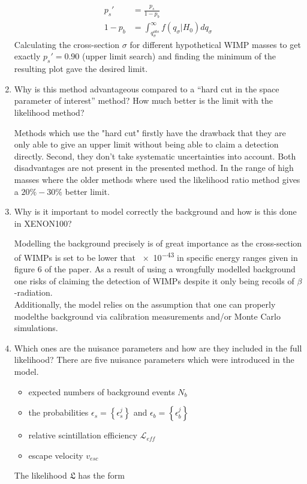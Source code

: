 \documentclass[10pt]{article}
\newenvironment{myfont}{\fontfamily{put}\selectfont}{\par}
\newcommand{\likelihood}{\mathfrak{L}}
\begin{document}
\begin{myfont}
\begin{enumerate}[label = \textbf{\roman*}.]
  \begin{align}
      p_s' &= \frac{p_s}{1-p_b} \\
      1 - p_b  &= \int^\infty_{q^{obs}_{\sigma}} f(q_{\sigma}|H_{0})  dq_{\sigma}
  \end{align}
  Calculating the cross-section $\sigma$ for different hypothetical WIMP masses to get exactly $p_s'=0.90$ (upper limit search) and finding the minimum of the resulting plot gave the desired limit.

  \item Why is this method advantageous compared to a “hard cut in the space parameter of interest” method?  How much better is the limit with the likelihood method?
  \noindent

  Methods which use the "hard cut" firstly have the drawback that they are only able to give an upper limit without being able to claim a detection directly. Second, they don't take systematic uncertainties into account. Both disadvantages are not present in the presented method. In the range of high masses where the older methods where used the likelihood ratio method gives a $20\% - 30\%$ better limit.

  \item Why is it important to model correctly the background and how is this done in XENON100?
  \noindent

  Modelling the background precisely is of great importance as the cross-section of WIMPs is set to be lower that \num{e-43} in specific energy ranges given in figure 6 of the paper.
  As a result of using a wrongfully modelled background one risks of claiming the detection of WIMPs despite it only being recoils of $\beta$-radiation. \\
  Additionally, the model relies on the assumption that one can properly modelthe background via calibration measurements and/or Monte Carlo simulations.


  \item Which  ones  are  the  nuisance  parameters  and  how  are  they  included  in  the  full likelihood?
  \noindent
  There are five nuisance parameters which were introduced in the model.
  \begin{itemize}
      \item expected numbers of background events $N_b$
      \item the probabilities $\epsilon_s = \left\{ \epsilon^j_s\right\}$ and $\epsilon_b = \left\{ \epsilon^j_b\right\}$
      \item relative scintillation efficiency $\mathcal{L}_{eff}$
      \item escape velocity $v_{esc}$
  \end{itemize}
  The likelihood $\likelihood$ has the form


\end{enumerate}
\end{myfont}
\end{document}
